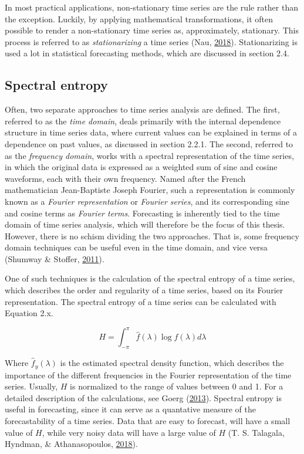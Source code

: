 \documentclass[12pt,oneside]{reedthesis}
\begin{document}
In most practical applications, non-stationary time series are the rule
rather than the exception. Luckily, by applying mathematical
transformations, it often possible to render a non-stationary time
series as, approximately, stationary. This process is referred to as
\emph{stationarizing} a time series (Nau,
\protect\hyperlink{ref-nau2018}{2018}). Stationarizing is used a lot in
statistical forecasting methods, which are discussed in section 2.4.

\subsection{Spectral entropy}\label{spectral-entropy}

Often, two separate approaches to time series analysis are defined. The
first, referred to as the \emph{time domain}, deals primarily with the
internal dependence structure in time series data, where current values
can be explained in terms of a dependence on past values, as discussed
in section 2.2.1. The second, referred to as the \emph{frequency
domain}, works with a spectral representation of the time series, in
which the original data is expressed as a weighted sum of sine and
cosine waveforms, each with their own frequency. Named after the French
mathematician Jean-Baptiste Joseph Fourier, such a representation is
commonly known as a \emph{Fourier representation} or \emph{Fourier
series}, and its corresponding sine and cosine terms as \emph{Fourier
terms}. Forecasting is inherently tied to the time domain of time series
analysis, which will therefore be the focus of this thesis. However,
there is no schism dividing the two approaches. That is, some frequency
domain techniques can be useful even in the time domain, and vice versa
(Shumway \& Stoffer, \protect\hyperlink{ref-shumway2011}{2011}).

One of such techniques is the calculation of the spectral entropy of a
time series, which describes the order and regularity of a time series,
based on its Fourier representation. The spectral entropy of a time
series can be calculated with Equation 2.x.

\[ H = \int_{-\pi}^{\pi} \hat{f}(\lambda)\log \hat{f}(\lambda)d\lambda\]

Where \(\hat{f}_{y}(\lambda)\) is the estimated spectral density
function, which describes the importance of the different frequencies in
the Fourier representation of the time series. Usually, \(H\) is
normalized to the range of values between 0 and 1. For a detailed
description of the calculations, see Goerg
(\protect\hyperlink{ref-goerg2013}{2013}). Spectral entropy is useful in
forecasting, since it can serve as a quantative measure of the
forecastability of a time series. Data that are easy to forecast, will
have a small value of \(H\), while very noisy data will have a large
value of \(H\) (T. S. Talagala, Hyndman, \& Athanasopoulos,
\protect\hyperlink{ref-talagala2018}{2018}).
\end{document}
